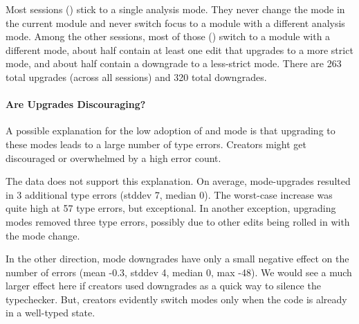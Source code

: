 \documentclass[english,submission,cleveref]{programming}
\begin{document}
Most sessions () stick to a single analysis mode.
They never change the mode in the current module and never
switch focus to a module with a different analysis mode.
Among the other sessions, most of those () switch to a
module with a different mode, about half contain at least one edit that
upgrades to a more strict mode, and about half contain a downgrade to a
less-strict mode.
There are 263 total upgrades (across all sessions) and 320 total downgrades.


\paragraph{Are Upgrades Discouraging?}


A possible explanation for the low adoption of \mnonstrict{} and
\mstrict{} mode is that upgrading to these modes leads to a large
number of type errors.
Creators might get discouraged or overwhelmed by a high error count.

The data does not support this explanation.
On average, mode-upgrades resulted in 3 additional
type errors (stddev 7, median 0).
The worst-case increase was quite high at 57 type errors, but exceptional.
In another exception, upgrading modes removed three type errors,
possibly due to other edits being rolled in with the
mode change.

In the other direction, mode downgrades have only a small negative effect on the
number of errors (mean -0.3, stddev 4, median 0, max -48).
We would see a much larger effect here if creators used downgrades
as a quick way to silence the typechecker.
But, creators evidently switch modes only when the code is already
in a well-typed state.


\end{document}
